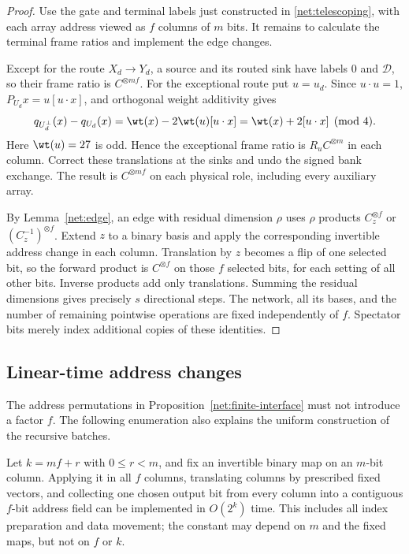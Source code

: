 \begin{proof}
Use the gate and terminal labels just constructed in
\eqref{net:telescoping}, with each array address viewed as $f$ columns
of $m$ bits.  It remains to calculate the terminal frame ratios and
implement the edge changes.

Except for the route $X_d\to Y_d$, a source and its routed sink
have labels $0$ and $\mathcal D$, so their frame ratio is
$C^{\otimes mf}$.  For the exceptional route put $u=u_d$.
Since $u\cdot u=1$, $P_{U_d}x=u[u\cdot x]$, and orthogonal
weight additivity gives
\[
 q_{U_d^\perp}(x)-q_{U_d}(x)
 =\wt(x)-2\wt(u)[u\cdot x]
 =\wt(x)+2[u\cdot x]\pmod4.
\]
Here $\wt(u)=27$ is odd.  Hence the exceptional frame ratio is
$R_uC^{\otimes m}$ in each column.  Correct these translations
at the sinks and undo the signed bank exchange.  The result is
$C^{\otimes mf}$ on each physical role, including every
auxiliary array.

By Lemma~\ref{net:edge}, an edge with residual dimension $\rho$
uses $\rho$ products $C_z^{\otimes f}$ or
$(C_z^{-1})^{\otimes f}$.  Extend $z$ to a binary basis and apply
the corresponding invertible address change in each column.
Translation by $z$ becomes a flip of one selected bit, so the
forward product is $C^{\otimes f}$ on those $f$ selected bits,
for each setting of all other bits.  Inverse products add only
translations.  Summing the residual dimensions gives precisely
$s$ directional steps.  The network, all its bases, and the
number of remaining pointwise operations are fixed independently
of $f$.  Spectator bits merely index additional copies of these
identities.
\end{proof}

\subsection{Linear-time address changes}

The address permutations in Proposition~\ref{net:finite-interface}
must not introduce a factor $f$.  The following enumeration also
explains the uniform construction of the recursive batches.

\begin{lemma}\label{net:indexing}
Let $k=mf+r$ with $0\le r<m$, and fix an invertible binary map
on an $m$-bit column.  Applying it in all $f$ columns, translating
columns by prescribed fixed vectors, and collecting one chosen
output bit from every column into a contiguous $f$-bit address
field can be implemented in $O(2^k)$ time.  This includes all
index preparation and data movement; the constant may depend on
$m$ and the fixed maps, but not on $f$ or $k$.
\end{lemma}

